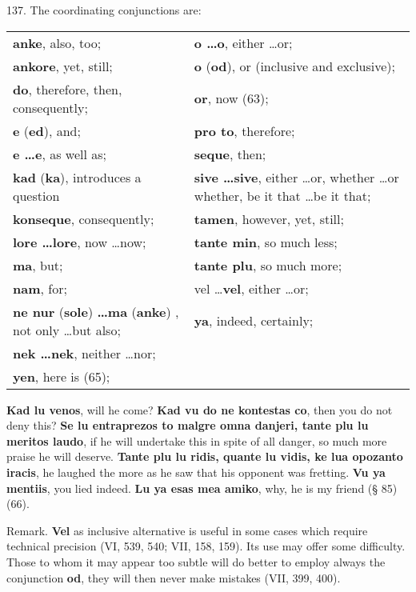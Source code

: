 137. The coordinating conjunctions are: \\
\begin{tabular}{l l}
\textbf{anke}, also, too; & \textbf{o \ldots o}, either \ldots or; \\
\textbf{ankore}, yet, still; & \textbf{o} (\textbf{od}), or (inclusive and exclusive); \\
\textbf{do}, therefore, then, consequently; & \textbf{or}, now (63); \\
\textbf{e} (\textbf{ed}), and; & \textbf{pro to}, therefore; \\
\textbf{e \ldots e}, as well as; & \textbf{seque}, then; \\
\textbf{kad} (\textbf{ka}), introduces a question & \textbf{sive \ldots sive}, either \ldots or, whether \ldots or whether, be it that \ldots be it that; \\
\textbf{konseque}, consequently; & \textbf{tamen}, however, yet, still; \\
\textbf{lore \ldots lore}, now \ldots now; & \textbf{tante min}, so much less; \\
\textbf{ma}, but; & \textbf{tante plu}, so much more; \\
\textbf{nam}, for; & vel \ldots \textbf{vel}, either \ldots or; \\
\textbf{ne nur }(\textbf{sole})\textbf{ \ldots ma }(\textbf{anke}) , not only \ldots but also; & \textbf{ya}, indeed, certainly; \\
\textbf{nek \ldots nek}, neither \ldots nor; &  \\ \textbf{yen}, here is (65);
\end{tabular}

\textbf{Kad lu venos}, will he come? \textbf{Kad vu do ne kontestas co}, then you do not deny this? \textbf{Se lu entraprezos to malgre omna danjeri, tante plu lu meritos laudo}, if he will undertake this in spite of all danger, so much more praise he will deserve. \textbf{Tante plu lu ridis, quante lu vidis, ke lua opozanto iracis}, he laughed the more as he saw that his opponent was fretting. \textbf{Vu ya mentiis}, you lied indeed. \textbf{Lu ya esas mea amiko}, why, he is my friend (§ 85) (66).

\small Remark. \textbf{Vel} as inclusive alternative is useful in some cases which require technical precision (VI, 539, 540; VII, 158, 159). Its use may offer some difficulty. Those to whom it may appear too subtle will do better to employ always the conjunction \textbf{od}, they will then never make mistakes (VII, 399, 400). \normalsize

